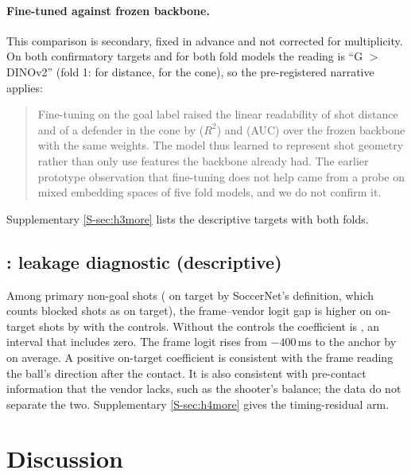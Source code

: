 \documentclass[10pt,twocolumn,letterpaper]{article}
\begin{document}
\paragraph{Fine-tuned against frozen backbone.} This comparison is secondary, fixed in advance and not corrected for
multiplicity. On both confirmatory targets and for both fold models the reading is ``G $>$ DINOv2'' (fold 1:
 for distance,  for the cone), so the pre-registered narrative applies:

\begin{quote}\small
Fine-tuning on the goal label raised the linear readability of shot distance and of a defender in the cone by
 ($R^2$) and  (AUC) over the frozen backbone with the same weights. The model thus
learned to represent shot geometry rather than only use features the backbone already had. The earlier prototype
observation that fine-tuning does not help came from a probe on mixed embedding spaces of five fold models, and we do
not confirm it.
\end{quote}

Supplementary \cref{S-sec:h3more} lists the descriptive targets with both folds.

\subsection{\Hfour: leakage diagnostic (descriptive)}

Among  primary non-goal shots ( on target by SoccerNet's definition, which counts blocked
shots as on target), the frame--vendor logit gap is higher on on-target shots by  with the controls.
Without the controls the coefficient is , an interval that includes zero. The frame logit rises from $-400$\,ms to the anchor by  on
average. A positive on-target coefficient is consistent with the frame reading the ball's direction after the contact.
It is also consistent with pre-contact information that the vendor lacks, such as the shooter's balance; the data
do not separate the two. Supplementary \cref{S-sec:h4more} gives the timing-residual arm.

\section{Discussion}
\label{sec:discussion}
\end{document}
